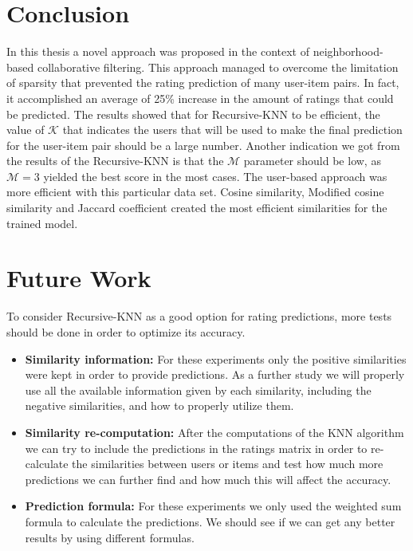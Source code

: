 
\section{Conclusion}
In this thesis a novel approach was proposed in the context of neighborhood-based
collaborative filtering. This approach managed to overcome the limitation
of sparsity that prevented the rating prediction of many user-item pairs.
In fact, it accomplished an average of 25\% increase in the amount of ratings that could be
predicted. The results showed that for Recursive-KNN to be efficient,
the value of $\mathcal{K}$ that indicates the users that will be used to make the final prediction
for the user-item pair should be a large number. Another indication we got from the
results of the Recursive-KNN is that the $\mathcal{M}$ parameter should be low, as
$\mathcal{M}=3$ yielded the best score in the most cases. The user-based approach was more
efficient with this particular data set. Cosine similarity, Modified cosine
similarity and Jaccard coefficient created the most efficient similarities for
the trained model.
\section{Future Work}
To consider Recursive-KNN as a good option for rating predictions, more tests
should be done in order to optimize its accuracy.
\begin{itemize}
    \item[] \textbf{Similarity information:} For these experiments only the
    positive similarities were kept in order to provide predictions. As a
    further study we will properly use all the available information given
    by each similarity, including the negative similarities, and how to
    properly utilize them.
    \item[] \textbf{Similarity re-computation:} After the computations of the KNN algorithm
    we can try to include the predictions in the ratings matrix in order to re-calculate the similarities
    between users or items and test how much more predictions we can further
    find and how much this will affect the accuracy.
    \item[] \textbf{Prediction formula:} For these experiments we only used
    the weighted sum formula to calculate the predictions. We should see
    if we can get any better results by using different formulas.
\end{itemize}
